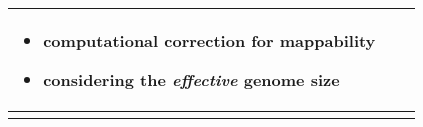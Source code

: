 \begin{minipage}{\textwidth}
\begin{singlespacing}
\begin{small}
\begin{longtable}{>{\textsf\bgroup\raggedleft\arraybackslash}p{3cm}<{\egroup} >{\textsf\bgroup}p{5cm}<{\egroup} >{\textsf\bgroup}p{6cm}<{\egroup}}
\begin{minipage}{6cm}
\begin{itemize}[noitemsep,leftmargin=*]
										\item computational correction for mappability \citep{Cheung2011}
										\item considering the \textit{effective} genome size \citep{Zhang2008}
					\end{itemize}	
				\vskip 4pt
			\end{minipage}
\tabularnewline \bottomrule
\label{tab:biases}
\end{longtable}
\end{small}
\end{singlespacing}
\end{minipage}
